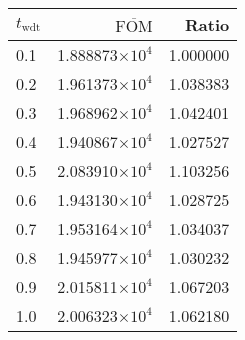 \begin{tabular}{lrr}
\toprule
$t_{\mathrm{wdt}}$ & $\overline{\mathrm{FOM}}$ &    Ratio \\
\midrule
               0.1 &   1.888873$\times 10^{4}$ & 1.000000 \\
               0.2 &   1.961373$\times 10^{4}$ & 1.038383 \\
               0.3 &   1.968962$\times 10^{4}$ & 1.042401 \\
               0.4 &   1.940867$\times 10^{4}$ & 1.027527 \\
               0.5 &   2.083910$\times 10^{4}$ & 1.103256 \\
               0.6 &   1.943130$\times 10^{4}$ & 1.028725 \\
               0.7 &   1.953164$\times 10^{4}$ & 1.034037 \\
               0.8 &   1.945977$\times 10^{4}$ & 1.030232 \\
               0.9 &   2.015811$\times 10^{4}$ & 1.067203 \\
               1.0 &   2.006323$\times 10^{4}$ & 1.062180 \\
\bottomrule
\end{tabular}
